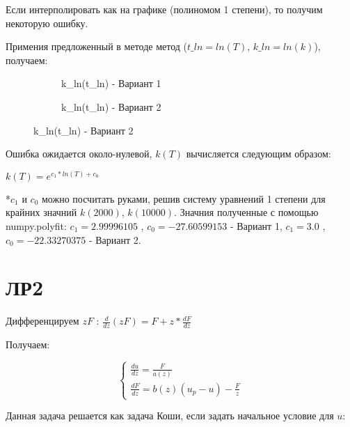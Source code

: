 \documentclass[a4paper,12pt]{article}
\begin{document}
    Если интерполировать как на графике (полиномом 1 степени), то получим некоторую ошибку.

    Примения предложенный в методе метод ($t\_ln=ln(T)$, $k\_ln=ln(k)$), получаем:

    \begin{figure}[H]
        \centering
        \begin{subfigure}{.5\textwidth}
          \centering
          \resizebox{\textwidth}{!}{}
          \caption{k\_ln(t\_ln) - Вариант 1}
          \label{fig:sub1}
        \end{subfigure}%
        \begin{subfigure}{.5\textwidth}
          \centering
          \resizebox{\textwidth}{!}{}
          \caption{k\_ln(t\_ln) - Вариант 2}
          \label{fig:sub2}
        \end{subfigure}
        \label{fig:test}
    \end{figure}

    Ошибка ожидается около-нулевой, $k(T)$ вычисляется следующим образом:

    $k(T) = e^{c_{1} * ln(T) + c_{0}}$

    \small
    *$c_{1}$ и $c_{0}$ можно посчитать руками, решив систему уравнений 1 степени для крайних значний
    $k(2000)$, $k(10000)$. Значния полученные с помощью numpy.polyfit: 
    $c_{1}=2.99996105$ , $c_{0}=-27.60599153$ - Вариант 1,
    $c_{1}=3.0$ , $c_{0}=-22.33270375$ - Вариант 2.
    \normalsize

    \newpage
    \section*{ЛР2}

    Дифференцируем $zF$ : $\frac{d}{dz}(zF)=F+z*\frac{dF}{dz}$

    Получаем:

    \Large
    \begin{equation}
        \begin{cases}
            \frac{du}{dz}=\frac{F}{a(z)}\\
            \frac{dF}{dz}=b(z)(u_p - u)-\frac{F}{z}
        \end{cases}
    \end{equation}
    \normalsize

    Данная задача решается как задача Коши, если задать начальное условие для $u$:
\end{document}
